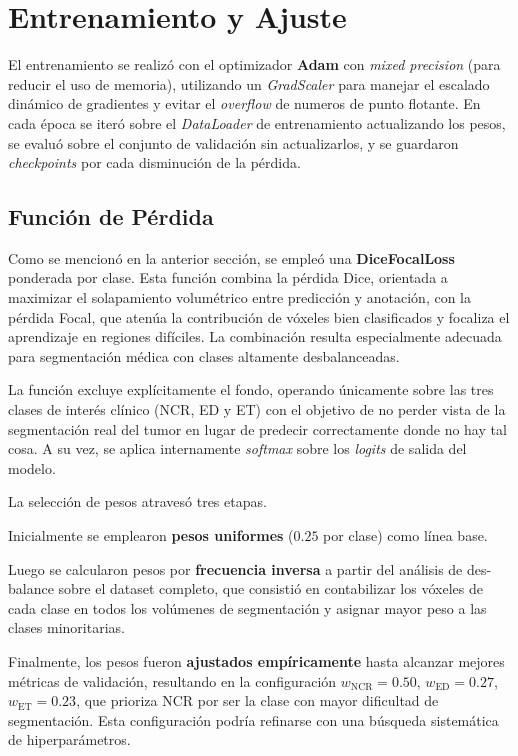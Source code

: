 \section{Entrenamiento y Ajuste}

El entrenamiento se realizó con el optimizador \textbf{Adam} con \textit{mixed precision} (para reducir el uso de memoria), utilizando un \textit{GradScaler} para manejar el escalado dinámico de gradientes y evitar el \textit{overflow} de numeros de punto flotante.
En cada época se iteró sobre el \textit{DataLoader} de entrenamiento actualizando los pesos, se evaluó sobre el conjunto de validación sin actualizarlos, y se guardaron \textit{checkpoints} por cada disminución de la pérdida.

\subsection{Función de Pérdida}
\label{sec:loss_func}

Como se mencionó en la anterior sección, se empleó una \textbf{DiceFocalLoss} ponderada por clase. Esta función combina la pérdida Dice, orientada a maximizar el solapamiento volumétrico entre predicción y anotación, con la pérdida Focal, que atenúa la contribución de vóxeles bien clasificados y focaliza el aprendizaje en regiones difíciles. La combinación resulta especialmente adecuada para segmentación médica con clases altamente desbalanceadas.

La función excluye explícitamente el fondo, operando únicamente sobre las tres clases de interés clínico (NCR, ED y ET) con el objetivo de no perder vista de la segmentación real del tumor en lugar de predecir correctamente donde no hay tal cosa. A su vez, se aplica internamente \textit{softmax} sobre los \textit{logits} de salida del modelo.

La selección de pesos atravesó tres etapas. 

Inicialmente se emplearon \textbf{pesos uniformes} ($0.25$ por clase) como línea base. 

Luego se calcularon pesos por \textbf{frecuencia inversa} a partir del análisis de des-balance sobre el dataset completo, que consistió en contabilizar los vóxeles de cada clase en todos los volúmenes de segmentación y asignar mayor peso a las clases minoritarias.

Finalmente, los pesos fueron \textbf{ajustados empíricamente} hasta alcanzar mejores métricas de validación, resultando en la configuración $w_{\text{NCR}}=0.50$, $w_{\text{ED}}=0.27$, $w_{\text{ET}}=0.23$, que prioriza NCR por ser la clase con mayor dificultad de segmentación. Esta configuración podría refinarse con una búsqueda sistemática de hiperparámetros.

